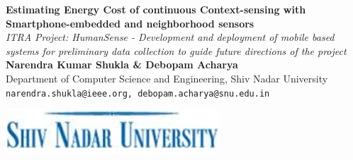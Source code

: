 \documentclass[a0,portrait]{a0poster}
\begin{document}


\begin{minipage}[b]{0.92\linewidth}
\veryHuge \color{NavyBlue} \textbf{Estimating Energy Cost of continuous Context-sensing with Smartphone-embedded and neighborhood sensors} \color{Black}\\ %
\Huge\textit{ITRA Project: HumanSense - Development and deployment of mobile based systems for preliminary data collection to guide future directions of the project
 }\\[0.3cm] %
\huge \textbf{Narendra Kumar Shukla \& Debopam Acharya}\\[0.3cm] %
\huge Department of Computer Science and Engineering, Shiv Nadar University\\[0.3cm] %
\Large \texttt{narendra.shukla@ieee.org, debopam.acharya@snu.edu.in}\\
\end{minipage}
%
\begin{minipage}[b]{0.10\linewidth}
\includegraphics[width=8cm]{snulogo.png}\\
\end{minipage}
\vspace{0.5cm} %

\end{document}

